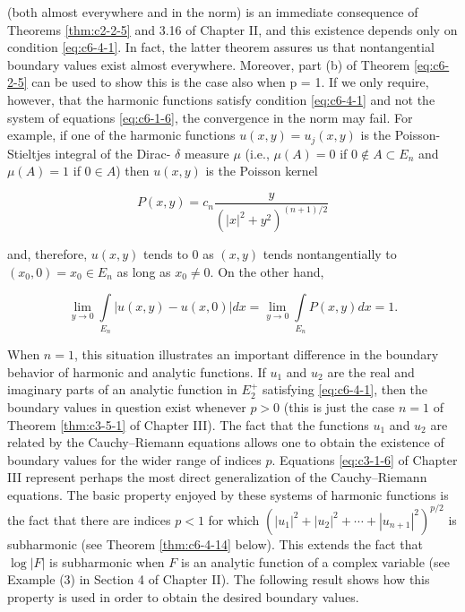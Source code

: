 (both almost everywhere and in the norm) is an immediate consequence of Theorems \ref{thm:c2-2-5} and 3.16 of Chapter II, and this existence depends only on condition \eqref{eq:c6-4-1}. In fact, the latter theorem assures us that nontangential boundary values exist almost everywhere. Moreover, part (b) of Theorem \ref{eq:c6-2-5} can be used to show this is the case also when p = 1. If we only require, however, that the harmonic functions satisfy condition \eqref{eq:c6-4-1} and not the system of equations \eqref{eq:c6-1-6}, the convergence in the norm may fail. For example, if one of the harmonic functions $u(x, y) = u_j(x, y)$ is the Poisson-Stieltjes integral of the Dirac- $\delta$ measure $\mu$ (i.e., $\mu(A) = 0$ if $0 \notin A \subset E_n$ and $\mu(A) = 1$ if $0 \in A$) then $u(x, y)$ is the Poisson kernel

\[
P(x,y)=c_{n}\frac{y}{\left(\left|x\right|^{2}+y^{2}\right)^{(n+1)/2}}
\]

and, therefore, $u(x, y)$ tends to 0 as $(x, y)$ tends nontangentially to $(x_0, 0) = x_0 \in E_n$ as long as $x_0 \neq 0$. On the other hand,

\[
\lim_{y\to0}\int\limits_{E_{n}}\left|u(x,y)-u(x,0)\right|dx=\lim_{y\to0}\int\limits_{E_{n}}P(x,y)dx=1.
\]

When $n=1$, this situation illustrates an important difference in the boundary behavior of harmonic and analytic functions. If $u_1$ and $u_2$ are the real and imaginary parts of an analytic function in $E_2^+$ satisfying \eqref{eq:c6-4-1}, then the boundary values in question exist whenever $p>0$ (this is just the case $n=1$ of Theorem \ref{thm:c3-5-1} of Chapter III). The fact that the functions $u_1$ and $u_2$ are related by the Cauchy--Riemann equations allows one to obtain the existence of boundary values for the wider range of indices $p$. Equations \eqref{eq:c3-1-6} of Chapter III represent perhaps the most direct generalization of the Cauchy--Riemann equations. The basic property enjoyed by these systems of harmonic functions is the fact that there are indices $p<1$ for which $(|u_1|^2 + |u_2|^2 + \cdots + |u_{n+1}|^2)^{p/2}$ is subharmonic (see Theorem \ref{thm:c6-4-14} below). This extends the fact that $\log|F|$ is subharmonic when $F$ is an analytic function of a complex variable (see Example (3) in Section 4 of Chapter II). The following result shows how this property is used in order to obtain the desired boundary values.

